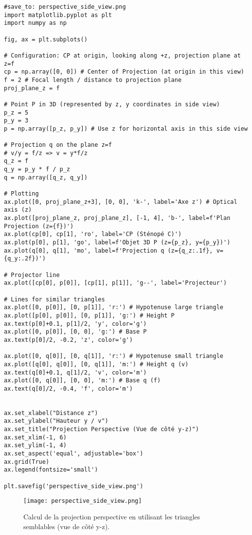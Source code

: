 \documentclass{article}
\begin{document}
\begin{verbatim}
#save_to: perspective_side_view.png
import matplotlib.pyplot as plt
import numpy as np

fig, ax = plt.subplots()

# Configuration: CP at origin, looking along +z, projection plane at z=f
cp = np.array([0, 0]) # Center of Projection (at origin in this view)
f = 2 # Focal length / distance to projection plane
proj_plane_z = f

# Point P in 3D (represented by z, y coordinates in side view)
p_z = 5
p_y = 3
p = np.array([p_z, p_y]) # Use z for horizontal axis in this side view

# Projection q on the plane z=f
# v/y = f/z => v = y*f/z
q_z = f
q_y = p_y * f / p_z
q = np.array([q_z, q_y])

# Plotting
ax.plot([0, proj_plane_z+3], [0, 0], 'k-', label='Axe z') # Optical axis (z)
ax.plot([proj_plane_z, proj_plane_z], [-1, 4], 'b-', label=f'Plan Projection (z={f})')
ax.plot(cp[0], cp[1], 'ro', label='CP (Sténopé C)')
ax.plot(p[0], p[1], 'go', label=f'Objet 3D P (z={p_z}, y={p_y})')
ax.plot(q[0], q[1], 'mo', label=f'Projection q (z={q_z:.1f}, v={q_y:.2f})')

# Projector line
ax.plot([cp[0], p[0]], [cp[1], p[1]], 'g--', label='Projecteur')

# Lines for similar triangles
ax.plot([0, p[0]], [0, p[1]], 'r:') # Hypotenuse large triangle
ax.plot([p[0], p[0]], [0, p[1]], 'g:') # Height P
ax.text(p[0]+0.1, p[1]/2, 'y', color='g')
ax.plot([0, p[0]], [0, 0], 'g:') # Base P
ax.text(p[0]/2, -0.2, 'z', color='g')

ax.plot([0, q[0]], [0, q[1]], 'r:') # Hypotenuse small triangle
ax.plot([q[0], q[0]], [0, q[1]], 'm:') # Height q (v)
ax.text(q[0]+0.1, q[1]/2, 'v', color='m')
ax.plot([0, q[0]], [0, 0], 'm:') # Base q (f)
ax.text(q[0]/2, -0.4, 'f', color='m')


ax.set_xlabel("Distance z")
ax.set_ylabel("Hauteur y / v")
ax.set_title("Projection Perspective (Vue de côté y-z)")
ax.set_xlim(-1, 6)
ax.set_ylim(-1, 4)
ax.set_aspect('equal', adjustable='box')
ax.grid(True)
ax.legend(fontsize='small')

plt.savefig('perspective_side_view.png')
\end{verbatim}

\begin{figure}[H]
\centering
\texttt{[image: perspective\_side\_view.png]}
\caption{Calcul de la projection perspective en utilisant les triangles semblables (vue de côté y-z).}
\label{fig:perspective_side_view}
\end{figure}
\end{document}
